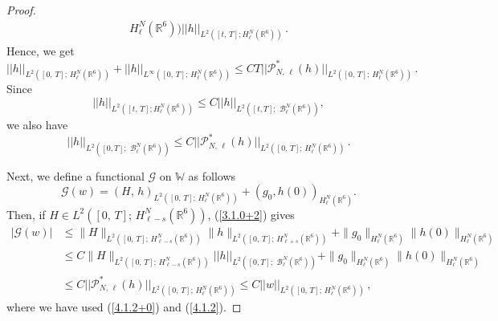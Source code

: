 \documentclass{amsart}[12pt, article]
\begin{document}
\begin{proof}
\begin{align*}
{H^N_\ell({{{\mathbb R}}}^6))} || h||_{L^2([t,\,T]; H^N_\ell({{{\mathbb R}}}^6))}\,.
\end{align*}
Hence, we get
\begin{equation}\label{4.1.2+0}
|| h||_{L^2 ([0,\,T];\, H^N_\ell({{{\mathbb R}}}^6))}+|| h||_{L^\infty
([0,\,T];\, H^N_\ell({{{\mathbb R}}}^6))}  \leq CT ||  {\mathcal P}^*_{N,\,\ell}
(h) ||_{L^2 ([0,\,T];\, H^N_\ell({{{\mathbb R}}}^6))}\,.
\end{equation}
Since
$$
|| h||_{L^2([t,\,T]; H^N_\ell({{{\mathbb R}}}^6))}\leq C || h ||_{L^2([t,
T];\,\,{{\mathcal B}}^N_\ell({{{\mathbb R}}}^6))},
$$
 we also have
\begin{equation}\label{4.1.2}
 || h ||_{L^2([0,
T];\,\,{{\mathcal B}}^N_\ell({{{\mathbb R}}}^6))}\leq C ||  {\mathcal P}^*_{N,\,\ell} (h)
||_{L^2 ([0,\,T];\, H^N_\ell({{{\mathbb R}}}^6))}\,.
\end{equation}

Next, we define a functional ${\mathcal G}$ on ${\mathbb W}$ as
follows
$$
{\mathcal G}(w) = (H,\,h)_{L^2 ([0,\,T];\, H^N_\ell({{{\mathbb R}}}^6))} + ( g_0
, h(0))_{H^N_\ell({{{\mathbb R}}}^6)}.
$$
Then, if $H\in L^2 ([0,\,T];\, H^N_{\ell-s}({{{\mathbb R}}}^6))$,
(\ref{3.1.0+2})
gives
\begin{align*}
 |{\mathcal G}(w)| &\leq \|H\|_{L^2 ([0,\,T];\, H^N_{\ell-s}({{{\mathbb R}}}^6))}\|h\|_{L^2
([0,\,T];\, H^N_{\ell+s}({{{\mathbb R}}}^6))}
+\|g_0\|_{H^N_\ell({{{\mathbb R}}}^6)}\|h(0)\|_{H^N_\ell({{{\mathbb R}}}^6)}\\
&\leq C \|H\|_{L^2 ([0,\,T];\, H^N_{\ell-s}({{{\mathbb R}}}^6))}
|| h ||_{L^2([0, T];\,\,{{\mathcal B}}^N_\ell({{{\mathbb R}}}^6))}
+\|g_0\|_{H^N_\ell({{{\mathbb R}}}^6)}\|h(0)\|_{H^N_\ell({{{\mathbb R}}}^6)}\\
&\leq C || {\mathcal P}^*_{N,\,\ell} (h) ||_{L^2 ([0,\,T];\,
H^N_\ell({{{\mathbb R}}}^6))}\leq C|| w||_{L^2 ([0,\,T];\, H^N_\ell({{{\mathbb R}}}^6))}\, ,
\end{align*}
where we have used (\ref{4.1.2+0})   and (\ref{4.1.2}).


\end{proof}
\end{document}
